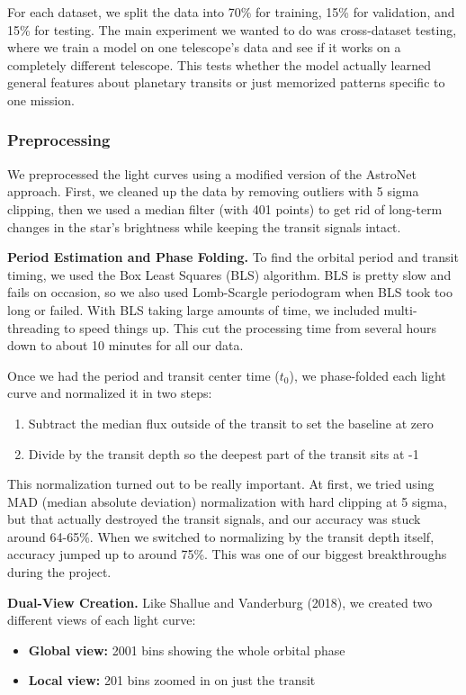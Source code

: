 \documentclass[letterpaper]{article} %
\begin{document}
For each dataset, we split the data into 70\% for training, 15\% for validation, and 15\% for testing. The main experiment we wanted to do was cross-dataset testing, where we train a model on one telescope's data and see if it works on a completely different telescope. This tests whether the model actually learned general features about planetary transits or just memorized patterns specific to one mission.

\subsubsection{Preprocessing}

We preprocessed the light curves using a modified version of the AstroNet approach. First, we cleaned up the data by removing outliers with 5 sigma clipping, then we used a median filter (with 401 points) to get rid of long-term changes in the star's brightness while keeping the transit signals intact.

\textbf{Period Estimation and Phase Folding.} To find the orbital period and transit timing, we used the Box Least Squares (BLS) algorithm. BLS is pretty slow and fails on occasion, so we also used Lomb-Scargle periodogram when BLS took too long or failed. With BLS taking large amounts of time, we included multi-threading to speed things up. This cut the processing time from several hours down to about 10 minutes for all our data.

Once we had the period and transit center time ($t_0$), we phase-folded each light curve and normalized it in two steps:
\begin{enumerate}
    \item Subtract the median flux outside of the transit to set the baseline at zero
    \item Divide by the transit depth so the deepest part of the transit sits at -1
\end{enumerate}

This normalization turned out to be really important. At first, we tried using MAD (median absolute deviation) normalization with hard clipping at 5 sigma, but that actually destroyed the transit signals, and our accuracy was stuck around 64-65\%. When we switched to normalizing by the transit depth itself, accuracy jumped up to around 75\%. This was one of our biggest breakthroughs during the project.

\textbf{Dual-View Creation.} Like Shallue and Vanderburg (2018), we created two different views of each light curve:
\begin{itemize}
    \item \textbf{Global view:} 2001 bins showing the whole orbital phase
    \item \textbf{Local view:} 201 bins zoomed in on just the transit
\end{itemize}
\end{document}
